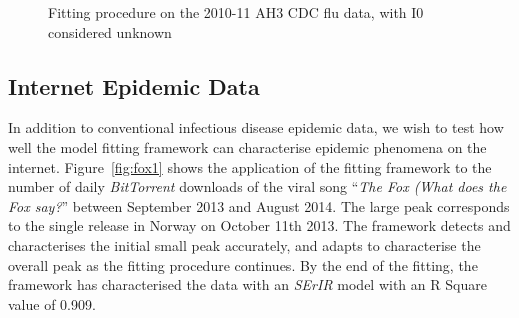 \begin{centering}
\begin{figure}[h!]
  \caption{Fitting procedure on the 2010-11 AH3 CDC flu data, with I0
    considered unknown}
\label{fig:unknown3}
  \end{figure}
\end{centering}


\subsection{Internet Epidemic Data}
In addition to conventional infectious disease epidemic data, we wish
to test how well the model fitting framework can characterise epidemic
phenomena on the internet. Figure~\ref{fig:fox1} shows the application
of the fitting framework to the number of daily \emph{BitTorrent}
downloads of the viral song ``\emph{The Fox (What does the Fox say?}''
between September 2013 and August 2014. The large peak corresponds to
the single release in Norway on October 11th 2013. The framework
detects and characterises the initial small peak accurately, and
adapts to characterise the overall peak as the fitting procedure
continues. By the end of the fitting, the framework has characterised
the data with an \emph{SErIR} model with an R Square value of 0.909.


